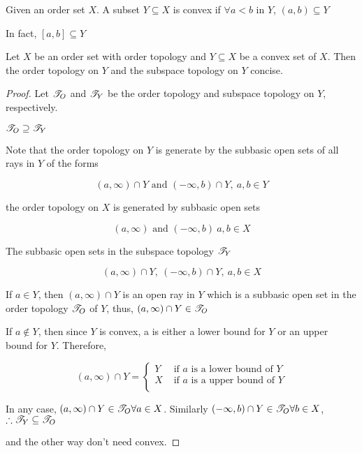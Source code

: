 \begin{defn}
	Given an order set $X$. A subset $Y \subseteq X$ is convex if $\forall a < b$ in $Y$, $(a,b) \subseteq Y$
	
	In fact, $[a,b] \subseteq Y$
\end{defn}

\begin{thm*}
	Let $X$ be an order set with order topology and $Y \subseteq X$ be a convex set of $X$. Then the order topology on $Y$ and the subspace topology on $Y$ concise.
\end{thm*}

\begin{proof}
	Let $\mathscr{T}_O$ and $\mathscr{T}_Y$ be the order topology and subspace topology on $Y$, respectively.
	
	$\mathscr{T}_O \supseteq \mathscr{T}_Y$
	
	Note that the order topology on $Y$ is generate by the subbasic open sets  of all rays in $Y$ of the forms
	
	$$(a,\infty)\cap Y \text{ and } (-\infty,b) \cap Y,~ a,b \in Y$$
	
	the order topology on $X$ is generated by subbasic open sets
	
	$$(a,\infty) \text{ and } (-\infty,b)~a,b \in X$$
	
	The subbasic open sets in the subspace topology $\mathscr{T}_Y$
	
	$$(a , \infty) \cap Y,~ ( -\infty , b) \cap Y,~ a,b \in X$$
	
	If $a \in Y$, then $(a , \infty) \cap Y$ is an open ray in $Y$ which is a subbasic open set in the order topology $\mathscr{T}_O$ of $Y$, thus, $(a,\infty) \cap Y \in \mathscr{T}_O$
	
	If $a \notin Y$, then since $Y$ is convex, a is either a lower bound for $Y$ or an upper bound for $Y$. Therefore,
	
	$$(a,\infty) \cap Y = \begin{cases}
		Y & \text{ if } a \text{ is a lower bound of } Y\\
		X & \text{ if } a \text{ is a upper bound of } Y\\
	\end{cases}$$
	
	In any case, $(a,\infty) \cap Y \in \mathscr{T}_O \forall a \in X$. Similarly $(-\infty , b) \cap Y \in \mathscr{T}_O \forall b \in X$, $\therefore \mathscr{T}_Y \subseteq \mathscr{T}_O$
	
	and the other way don't need convex.
\end{proof}
























